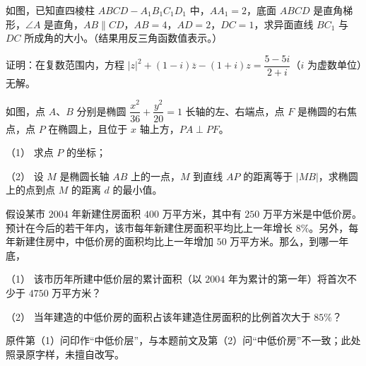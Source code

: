 \Needspace{0.4\textheight}
\begin{question}
如图，已知直四棱柱 $ABCD-A_1B_1C_1D_1$ 中，$AA_1=2$，底面 $ABCD$ 是直角梯形，$\angle A$ 是直角，$AB\parallel CD$，$AB=4$，$AD=2$，$DC=1$，求异面直线 $BC_1$ 与 $DC$ 所成角的大小。（结果用反三角函数值表示。）
\nopagebreak[4]
\begin{center}\end{center}
\nopagebreak[4]
\end{question}
\begin{question}
证明：在复数范围内，方程 $|z|^2+(1-i)\overline z-(1+i)z=\dfrac{5-5i}{2+i}$（$i$ 为虚数单位）无解。

\Needspace{0.4\textheight}
\end{question}
\begin{question}
如图，点 $A$、$B$ 分别是椭圆 $\dfrac{x^2}{36}+\dfrac{y^2}{20}=1$ 长轴的左、右端点，点 $F$ 是椭圆的右焦点，点 $P$ 在椭圆上，且位于 $x$ 轴上方，$PA\perp PF$。

（1） 求点 $P$ 的坐标；

（2） 设 $M$ 是椭圆长轴 $AB$ 上的一点，$M$ 到直线 $AP$ 的距离等于 $|MB|$，求椭圆上的点到点 $M$ 的距离 $d$ 的最小值。
\nopagebreak[4]
\begin{center}\end{center}
\nopagebreak[4]
\end{question}
\begin{question}
假设某市 $2004$ 年新建住房面积 $400$ 万平方米，其中有 $250$ 万平方米是中低价房。预计在今后的若干年内，该市每年新建住房面积平均比上一年增长 $8\%$。另外，每年新建住房中，中低价房的面积均比上一年增加 $50$ 万平方米。那么，到哪一年底，

（1） 该市历年所建中低价层的累计面积（以 $2004$ 年为累计的第一年）将首次不少于 $4750$ 万平方米？

（2） 当年建造的中低价房的面积占该年建造住房面积的比例首次大于 $85\%$？

\begin{gktip}
原件第（1）问印作“中低价层”，与本题前文及第（2）问“中低价房”不一致；此处照录原字样，未擅自改写。
\end{gktip}

\end{question}
